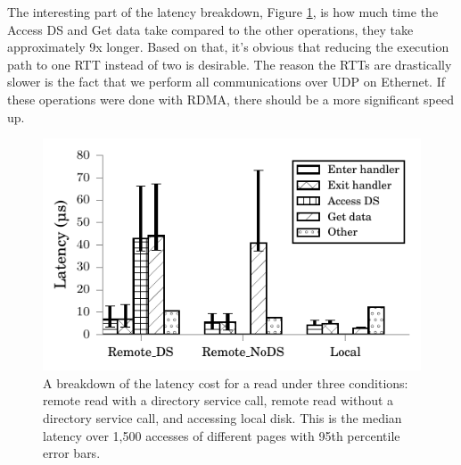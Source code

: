 The interesting part of the latency breakdown, Figure \ref{fig:read_breakdown}, is how much time the Access DS and Get data take compared to the other operations, they take approximately 9x longer. Based on that, it's obvious that reducing the execution path to one RTT instead of two is desirable. The reason the RTTs are drastically slower is the fact that we perform all communications over UDP on Ethernet. If these operations were done with RDMA, there should be a more significant speed up.

\begin{figure}[t]
    \centering
    \includegraphics{Graphs/Latency_Breakdown_Read.pdf}
    \caption{A breakdown of the latency cost for a read under three conditions: remote read with a directory service call, remote read without a directory service call, and accessing local disk. This is the median latency over 1,500 accesses of different pages with 95th percentile error bars.}
    \label{fig:read_breakdown}
\end{figure}



